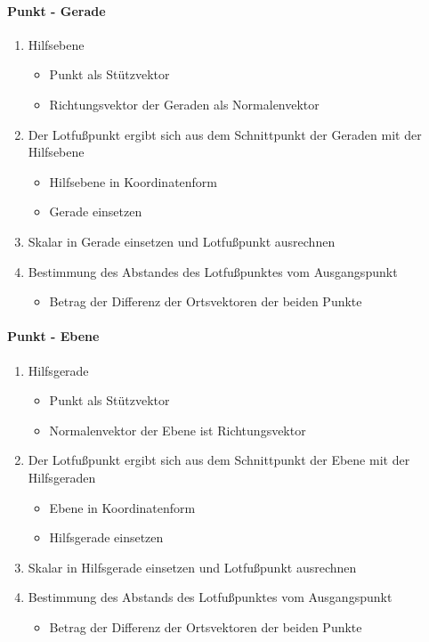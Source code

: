 \documentclass{article}
\begin{document}
  \paragraph{Punkt - Gerade}
  \begin{enumerate}
 	\item Hilfsebene 
 	\begin{itemize}
 		\item Punkt als Stützvektor
 		\item Richtungsvektor der Geraden als Normalenvektor
 	\end{itemize}
 	\item Der Lotfußpunkt ergibt sich aus dem Schnittpunkt der Geraden mit der Hilfsebene
 	\begin{itemize}
 		\item Hilfsebene in Koordinatenform
 		\item Gerade einsetzen
 	\end{itemize}
 	\item Skalar in Gerade einsetzen und Lotfußpunkt ausrechnen
 	\item Bestimmung des Abstandes des Lotfußpunktes vom Ausgangspunkt
 	\begin{itemize}
 		\item Betrag der Differenz der Ortsvektoren der beiden Punkte
 	\end{itemize}
  \end{enumerate}
  
  \paragraph{Punkt - Ebene}
  \begin{enumerate}
  	\item Hilfsgerade
  	\begin{itemize}
  		\item Punkt als Stützvektor
  		\item Normalenvektor der Ebene ist Richtungsvektor
  	\end{itemize}
  	\item Der Lotfußpunkt ergibt sich aus dem Schnittpunkt der Ebene mit der Hilfsgeraden
  	\begin{itemize}
  		\item Ebene in Koordinatenform
  		\item Hilfsgerade einsetzen
  	\end{itemize}
  	\item Skalar in Hilfsgerade einsetzen und Lotfußpunkt ausrechnen
  	\item Bestimmung des Abstands des Lotfußpunktes vom Ausgangspunkt
  	\begin{itemize}
  		\item Betrag der Differenz der Ortsvektoren der beiden Punkte
  	\end{itemize}
  \end{enumerate}
  
\end{document}
